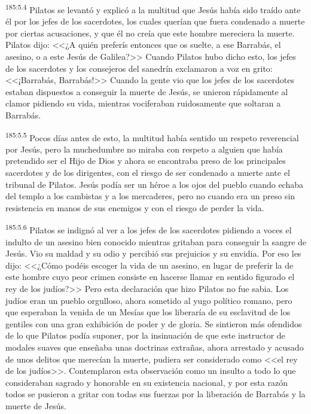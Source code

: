 \par 
\textsuperscript{185:5.4} Pilatos se levantó y explicó a la multitud que Jesús había sido traído ante él por los jefes de los sacerdotes, los cuales querían que fuera condenado a muerte por ciertas acusaciones, y que él no creía que este hombre mereciera la muerte. Pilatos dijo: <<¿A quién preferís entonces que os suelte, a ese Barrabás, el asesino, o a este Jesús de Galilea?>> Cuando Pilatos hubo dicho esto, los jefes de los sacerdotes y los consejeros del sanedrín exclamaron a voz en grito: <<¡Barrabás, Barrabás!>> Cuando la gente vio que los jefes de los sacerdotes estaban dispuestos a conseguir la muerte de Jesús, se unieron rápidamente al clamor pidiendo su vida, mientras vociferaban ruidosamente que soltaran a Barrabás.

\par 
\textsuperscript{185:5.5} Pocos días antes de esto, la multitud había sentido un respeto reverencial por Jesús, pero la muchedumbre no miraba con respeto a alguien que había pretendido ser el Hijo de Dios y ahora se encontraba preso de los principales sacerdotes y de los dirigentes, con el riesgo de ser condenado a muerte ante el tribunal de Pilatos. Jesús podía ser un héroe a los ojos del pueblo cuando echaba del templo a los cambistas y a los mercaderes, pero no cuando era un preso sin resistencia en manos de sus enemigos y con el riesgo de perder la vida.

\par 
\textsuperscript{185:5.6} Pilatos se indignó al ver a los jefes de los sacerdotes pidiendo a voces el indulto de un asesino bien conocido mientras gritaban para conseguir la sangre de Jesús. Vio su maldad y su odio y percibió sus prejuicios y su envidia. Por eso les dijo: <<¿Cómo podéis escoger la vida de un asesino, en lugar de preferir la de este hombre cuyo peor crimen consiste en hacerse llamar en sentido figurado el rey de los judíos?>> Pero esta declaración que hizo Pilatos no fue sabia. Los judíos eran un pueblo orgulloso, ahora sometido al yugo político romano, pero que esperaban la venida de un Mesías que los liberaría de su esclavitud de los gentiles con una gran exhibición de poder y de gloria. Se sintieron más ofendidos de lo que Pilatos podía suponer, por la insinuación de que este instructor de modales suaves que enseñaba unas doctrinas extrañas, ahora arrestado y acusado de unos delitos que merecían la muerte, pudiera ser considerado como <<el rey de los judíos>>. Contemplaron esta observación como un insulto a todo lo que consideraban sagrado y honorable en su existencia nacional, y por esta razón todos se pusieron a gritar con todas sus fuerzas por la liberación de Barrabás y la muerte de Jesús.

